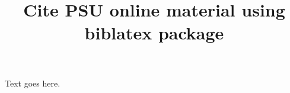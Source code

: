 \documentclass{article}
\title{Cite PSU online material using \textbf{biblatex} package}
\date{}
\begin{document}
\maketitle

Text goes here.
\nocite{newtest}
\printbibliography
\end{document}
